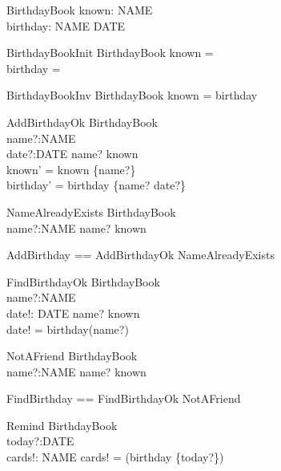 \begin{zed}
\end{zed}

\begin{schema}{BirthdayBook}
known: \power NAME \\
birthday: NAME \pfun DATE
\end{schema}

\begin{schema}{BirthdayBookInit}
BirthdayBook
\where
known = \emptyset \\
birthday = \emptyset
\end{schema}

\begin{schema}{BirthdayBookInv}
BirthdayBook
\where
known = \dom birthday
\end{schema}

\begin{schema}{AddBirthdayOk}
\Delta BirthdayBook \\
name?:NAME \\
date?:DATE
\where
name? \notin known \\
known' = known \cup \{name?\} \\
birthday' = birthday \cup \{name? \mapsto date?\}
\end{schema}

\begin{schema}{NameAlreadyExists}
\Xi BirthdayBook \\
name?:NAME
\where
name? \in known
\end{schema}

\begin{zed}
AddBirthday == AddBirthdayOk \lor NameAlreadyExists
\end{zed}

\begin{schema}{FindBirthdayOk}
\Xi BirthdayBook \\
name?:NAME \\
date!: DATE
\where
name? \in known \\
date! = birthday(name?)
\end{schema}

\begin{schema}{NotAFriend}
\Xi BirthdayBook \\
name?:NAME
\where
name? \notin known
\end{schema}

\begin{zed}
FindBirthday == FindBirthdayOk \lor NotAFriend
\end{zed}

\begin{schema}{Remind}
\Xi BirthdayBook \\
today?:DATE \\
cards!: \power NAME
\where
cards! = \dom(birthday \rres \{today?\})
\end{schema}


